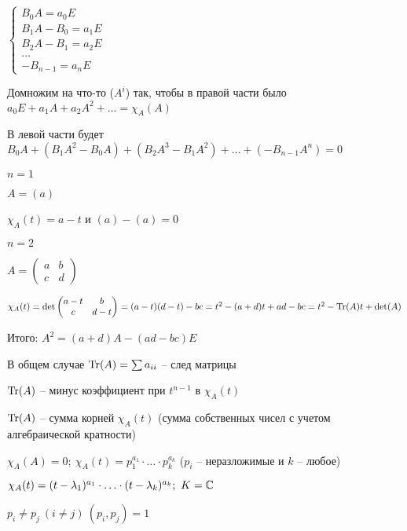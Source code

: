 \documentclass[12pt]{article}
\begin{document}
$\begin{cases}
    B_0A = a_0E \\
    B_1A - B_0 = a_1E \\
    B_2A - B_1 = a_2E \\
    \ldots \\
    -B_{n - 1} = a_nE
\end{cases}$

Домножим на что-то ($A^i$) так, чтобы в правой части было $a_0E + a_1A + a_2A^2 + \ldots = \chi_A(A)$

В левой части будет $B_0A + (B_1A^2 - B_0A) + (B_2A^3 - B_1A^2) + \ldots + (-B_{n - 1}A^n) = 0$

\begin{Example}{}
    $n = 1$

    $A = (a)$

    $\chi_A(t) = a - t$ и $(a) - (a) = 0$

    $n = 2$

    $A = \begin{pmatrix}
        a & b \\
        c & d
    \end{pmatrix}$

    $\chi_A(t) = \det \begin{pmatrix}
        a - t & b \\
        c & d - t
    \end{pmatrix} = (a - t)(d - t) - bc = t^2 - (a + d)t + ad - bc = t^2 - \operatorname{Tr}(A)t + \det(A)$

    Итого: $A^2 = (a + d)A - (ad - bc)E$
\end{Example}

\begin{Remark}{}
    В общем случае $\operatorname{Tr}(A) = \sum a_{ii}$ -- след матрицы

    $\operatorname{Tr}(A)$ -- минус коэффициент при $t^{n - 1}$ в $\chi_A(t)$

    $\operatorname{Tr}(A)$ -- сумма корней $\chi_A(t)$ (сумма собственных чисел с учетом алгебраической кратности)
\end{Remark}

\begin{Reminder}{}
    $\chi_A(A) = 0;\ \chi_A(t) = p_1^{a_1} \cdot \ldots \cdot p_k^{a_k}$ ($p_i$ -- неразложимые и $k$ -- любое)

    $\chi_A(t) = (t - \lambda_1)^{a_1} \cdot \ldots \cdot (t - \lambda_k)^{a_k};\ K = \mathbb C$

    $p_i \neq p_j\ (i \neq j)\ (p_i, p_j) = 1$
\end{Reminder}
\end{document}

